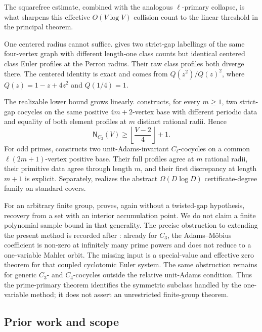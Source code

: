 The squarefree estimate, combined with the analogous \(\ell\)-primary
collapse, is what sharpens this effective \(O(V\log V)\) collision count to
the linear threshold in the principal theorem.

One centered radius cannot suffice.   gives
two strict-gap labellings of the same four-vertex graph with different
length-one class counts but identical centered class Euler profiles at the
Perron radius.  Their raw class profiles both diverge there.  The centered
identity is exact and comes from
\(Q(z^2)/Q(z)^2\), where \(Q(z)=1-z+4z^2\) and \(Q(1/4)=1\).

The realizable lower bound grows linearly.
 constructs, for every \(m\ge1\),
two strict-gap cocycles on the same positive \(4m+2\)-vertex base with
different periodic data and equality of both element profiles at \(m\)
distinct rational radii.  Hence
\[
 \mathsf N_{C_2}(V)\ge
 \left\lfloor\frac{V-2}{4}\right\rfloor+1.
\]
For odd primes,  constructs two
unit-Adams-invariant \(C_\ell\)-cocycles on a common
\(\ell(2m+1)\)-vertex positive base.  Their full profiles agree at \(m\)
rational radii, their primitive data agree through length \(m\), and their
first discrepancy at length \(m+1\) is explicit.  Separately,
 realizes the abstract
\(\Omega(D\log D)\) certificate-degree family on standard covers.

For an arbitrary finite group,  proves,
again without a twisted-gap hypothesis, recovery from a set with an interior
accumulation point.  We do not claim a
finite polynomial sample bound in that generality.  The precise obstruction
to extending the present method is recorded after
: already for \(C_3\), the
Adams--M\"obius coefficient is non-zero at infinitely many prime powers and
does not reduce to a one-variable Mahler orbit.  The missing input is a
special-value and effective zero theorem for that coupled cyclotomic Euler
system.  The same obstruction remains for generic \(C_3\)- and
\(C_4\)-cocycles outside the relative unit-Adams condition.  Thus the
prime-primary theorem identifies the symmetric subclass handled by the
one-variable method; it does not assert an unrestricted finite-group theorem.

\subsection{Prior work and scope}

